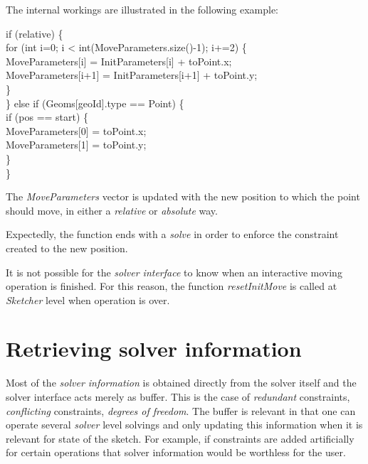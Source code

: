 \documentclass[12pt,twoside,a4paper]{book}
\begin{document}
    The internal workings are illustrated in the following example:

    \begin{codequote}
    if (relative) \{\\
    \-\hspace{0.25cm}for (int i=0; i \textless{} int(MoveParameters.size()-1); i+=2) \{\\
    \-\hspace{0.5cm}MoveParameters[i] = InitParameters[i] + toPoint.x;\\
     \-\hspace{0.5cm}MoveParameters[i+1] = InitParameters[i+1] + toPoint.y;\\
    \-\hspace{0.25cm}\}\\
    \} else if (Geoms[geoId].type == Point) \{\\
    \-\hspace{0.25cm}if (pos == start) \{\\
    \-\hspace{0.5cm}MoveParameters[0] = toPoint.x;\\
    \-\hspace{0.5cm}MoveParameters[1] = toPoint.y;\\
    \-\hspace{0.25cm}\}\\
    \}
    \end{codequote}

    The \emph{MoveParameters} vector is updated with the new position to which the point should move, in either a \emph{relative} or \emph{absolute} way.

    Expectedly, the function ends with a \emph{solve} in order to enforce the constraint created to the new position.

    It is not possible for the \emph{solver interface} to know when an interactive moving operation is finished. For this reason, the function \emph{resetInitMove} is called at \emph{Sketcher} level when operation is over.

    \section{Retrieving solver information}

    Most of the \emph{solver information} is obtained directly from the solver itself and the solver interface acts merely as buffer. This is the case of \emph{redundant} constraints, \emph{conflicting} constraints, \emph{degrees of freedom}. The buffer is relevant in that one can operate several \emph{solver} level solvings and only updating this information when it is relevant for state of the sketch. For example, if constraints are added artificially for certain operations that solver information would be worthless for the user.
\end{document}
